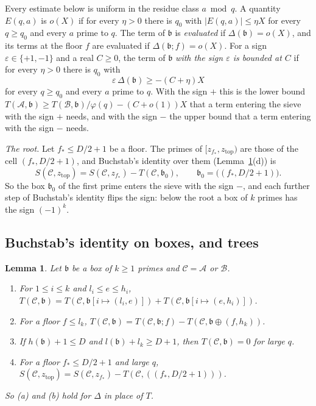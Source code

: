 \documentclass[11pt]{article}
\newtheorem{lemma}[theorem]{Lemma}
\theoremstyle{definition}
\begin{document}
Every estimate below is uniform in the residue class $a \bmod q$. A quantity $E(q, a)$ is $o(X)$ if for every $\eta >
0$ there is $q_0$
with $|E(q, a)| \le \eta X$ for every $q \ge q_0$ and every $a$ prime to $q$. The term of $\mathfrak b$ is
\emph{evaluated} if $\Delta(\mathfrak b) = o(X)$, and its terms at the floor $f$ are evaluated if $\Delta(\mathfrak b;
f) = o(X)$.
For a sign $\varepsilon \in \{+1, -1\}$ and a real $C \ge 0$, the term of $\mathfrak b$ \emph{with the sign
$\varepsilon$ is bounded at $C$} if for every $\eta > 0$ there is $q_0$ with
\[
  \varepsilon\, \Delta(\mathfrak b) \ge -(C + \eta) X
\]
for every $q \ge q_0$ and every $a$ prime to $q$. With the sign $+$ this is the lower bound $T(\mathcal A, \mathfrak b)
\ge T(\mathcal B, \mathfrak b)/\varphi(q) - (C + o(1))X$ that a term entering the sieve with the sign $+$ needs, and
with
the sign $-$ the upper bound that a term entering with the sign $-$ needs.

\emph{The root.} Let $f_* \le D/2 + 1$ be a floor. The primes of $[z_{f_*}, z_{\mathrm{top}})$ are those of the cell
$(f_*, D/2 + 1)$, and Buchstab's identity over them (Lemma~\ref{lem:box-identities}(d)) is
\[
  S(\mathcal C, z_{\mathrm{top}}) = S(\mathcal C, z_{f_*}) - T(\mathcal C, \mathfrak b_0), \qquad
  \mathfrak b_0 = \bigl((f_*, D/2 + 1)\bigr).
\]
So the box $\mathfrak b_0$ of the first prime enters the sieve with the sign $-$, and each further step of Buchstab's
identity flips the sign: below the root a box of $k$ primes has the sign $(-1)^k$.

\subsection{Buchstab's identity on boxes, and trees}

\begin{lemma}\label{lem:box-identities}
Let $\mathfrak b$ be a box of $k \ge 1$ primes and $\mathcal C = \mathcal A$ or $\mathcal B$.
\begin{enumerate}
\item[(a)] For $1 \le i \le k$ and $l_i \le e \le h_i$,
  $T(\mathcal C, \mathfrak b) = T(\mathcal C, \mathfrak b[i \mapsto (l_i, e)]) + T(\mathcal C, \mathfrak b[i \mapsto (e,
  h_i)])$.
\item[(b)] For a floor $f \le l_k$, $T(\mathcal C, \mathfrak b) = T(\mathcal C, \mathfrak b; f) - T(\mathcal C,
\mathfrak b
  \oplus (f, h_k))$.
\item[(c)] If $h(\mathfrak b) + 1 \le D$ and $l(\mathfrak b) + l_k \ge D + 1$, then $T(\mathcal C, \mathfrak b) = 0$ for
  large $q$.
\item[(d)] For a floor $f_* \le D/2 + 1$ and large $q$, $S(\mathcal C, z_{\mathrm{top}}) = S(\mathcal C, z_{f_*}) -
  T(\mathcal C, ((f_*, D/2 + 1)))$.
\end{enumerate}
So (a) and (b) hold for $\Delta$ in place of $T$.
\end{lemma}
\end{document}
